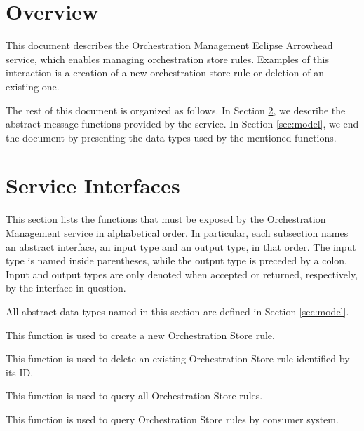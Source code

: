 \documentclass[a4paper]{arrowhead}
\begin{document}
\section{Overview}
\label{sec:overview}

This document describes the Orchestration Management Eclipse Arrowhead service, which enables managing orchestration store rules.
Examples of this interaction is a creation of a new orchestration store rule or deletion of an existing one.

The rest of this document is organized as follows.
In Section \ref{sec:functions}, we describe the abstract message functions provided by the service.
In Section \ref{sec:model}, we end the document by presenting the data types used by the mentioned functions.

\newpage

\section{Service Interfaces}
\label{sec:functions}

This section lists the functions that must be exposed by the Orchestration Management service in alphabetical order.
In particular, each subsection names an abstract interface, an input type and an output type, in that order.
The input type is named inside parentheses, while the output type is preceded by a colon.
Input and output types are only denoted when accepted or returned, respectively, by the interface in question.

All abstract data types named in this section are defined in Section \ref{sec:model}.


This function is used to create a new Orchestration Store rule.


This function is used to delete an existing Orchestration Store rule identified by its ID.


This function is used to query all Orchestration Store rules.


This function is used to query Orchestration Store rules by consumer system.

\end{document}
